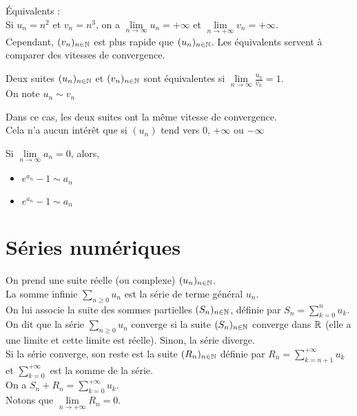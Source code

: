 \documentclass[../main.tex]{subfile}
\begin{document}
	\'Equivalents : \\
	Si $u_n = n^2$ et $v_n = n^3$, on a $\lim\limits_{n \to \infty} u_n = + \infty$ et $\lim\limits_{n \to + \infty} v_n = + \infty$.\\
	Cependant, $(v_n)_{n\in \mathbb{N}}$ est plus rapide que $(u_n)_{n\in \mathbb{N}}$. Les équivalents servent à comparer des vitesses de convergence.\\

\begin{defi}
	Deux suites $(u_n)_{n\in \mathbb{N}}$ et $(v_n)_{n \in \mathbb{N}}$ sont équivalentes si $\lim\limits_{n \to \infty} \frac{u_n}{v_n} = 1$.\\
	On note $u_n \sim v_n$
\end{defi}

Dans ce cas, les deux suites ont la même vitesse de convergence.\\
Cela n'a aucun intérêt que si $(u_n)$ tend vers $0$, $+\infty$ ou $-\infty$\\

\begin{ex}
	Si $\lim\limits_{n \to \infty} a_n = 0$, alors, \\
\begin{itemize}
	\item $e^{a_n} -1 \sim a_n$
	\item $e^{a_n} -1 \sim a_n$
\end{itemize}
\end{ex}

\part{Séries numériques}
On prend une suite réelle (ou complexe) $(u_n)_{n \in \mathbb{N}}$.\\
La somme infinie $\sum\limits_{n \geq 0} u_n$ est la série de terme général $u_n$.\\

On lui associe la suite des sommes partielles $(S_n)_{n \in \mathbb{N}}$, définie par $S_n = \sum\limits_{k = 0}^n u_k$.\\
On dit que la série $\sum\limits_{n \geq 0} u_n$ converge si la suite $(S_n)_{n \in \mathbb{N}}$ converge dans $\mathbb{R}$ (elle a une limite et cette limite est réelle). 
Sinon, la série diverge.\\

Si la série converge, son reste est la suite $(R_n)_{n \in \mathbb{N}}$ définie par $R_n = \sum\limits_{k = n+1}^{+\infty} u_k$ et $\sum\limits_{k = 0}^{+\infty}$ est la somme de la série.\\
On a $S_n + R_n = \sum\limits_{k=0}^{+\infty} u_k$.\\
Notons que $\lim\limits_{n \to +\infty} R_n = 0$.
\end{document}
